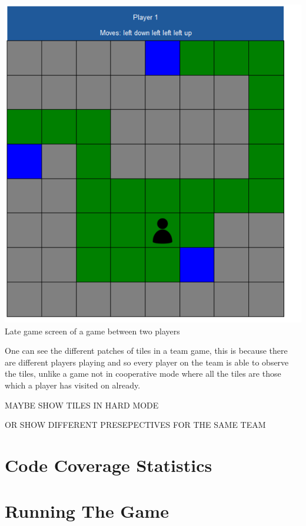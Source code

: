 \documentclass[a4paper,12pt]{extarticle}
\begin{document}
\begin{center}
\includegraphics[scale=0.5]{Team2.png}\\
Late game screen of a game between two players
\end{center}

One can see the different patches of tiles in a team game, this is because there are different players playing and so every player on the team is able to observe the tiles, unlike a game not in cooperative mode where all the tiles are those which a player has visited on already.

MAYBE SHOW TILES IN HARD MODE

OR SHOW DIFFERENT PRESEPECTIVES FOR THE SAME TEAM 

\newpage 
\section{Code Coverage Statistics}

\section{Running The Game}
\end{document}
